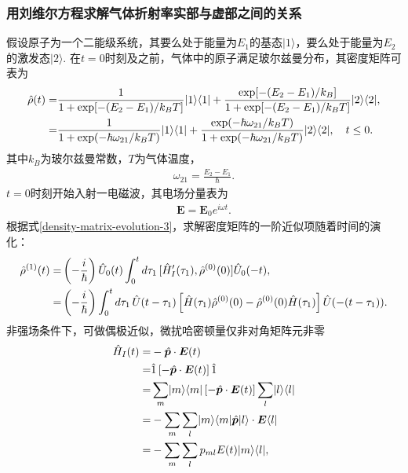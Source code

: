 \documentclass{assignment}
\begin{document}
\subsubsection{用刘维尔方程求解气体折射率实部与虚部之间的关系}
假设原子为一个二能级系统，其要么处于能量为$E_1$的基态$\lvert 1\rangle$，要么处于能量为$E_2$的激发态$\lvert 2\rangle$. 在$t=0$时刻及之前，气体中的原子满足玻尔兹曼分布，其密度矩阵可表为
\begin{align}
    \notag\hat{\rho}(t)=&\frac{1}{1+\exp[-(E_2-E_1)/k_BT]}\lvert 1\rangle\langle 1\rvert+\frac{\exp[-(E_2-E_1)/k_B]}{1+\exp[-(E_2-E_1)/k_BT]}\lvert 2\rangle\langle 2\rvert,\\
    =&\frac{1}{1+\exp(-\hbar\omega_{21}/k_BT)}\lvert 1\rangle\langle 1\rvert+\frac{\exp(-\hbar\omega_{21}/k_BT)}{1+\exp(-\hbar\omega_{21}/k_BT)}\lvert 2\rangle\langle 2\rvert,\quad t\leq 0.
\end{align}
其中$k_B$为玻尔兹曼常数，$T$为气体温度，
\begin{align}
    \omega_{21}=\frac{E_2-E_1}{\hbar}.
\end{align}
$t=0$时刻开始入射一电磁波，其电场分量表为
\begin{align}
    \bm{E}=\bm{E}_0e^{i\omega t}.
\end{align}
根据式\eqref{density-matrix-evolution-3}，求解密度矩阵的一阶近似项随着时间的演化：
\begin{align}
    \label{density-matrix-evolution-4}
    \notag\hat{\rho}^{(1)}(t)=&\left(-\frac{i}{\hbar}\right)\hat{U}_0(t)\int_0^td\tau_1\,[\hat{H}_I'(\tau_1),\hat{\rho}^{(0)}(0)]\hat{U}_0(-t),\\
    =&\left(-\frac{i}{\hbar}\right)\int_0^td\tau_1\,\hat{U}(t-\tau_1)\left[\hat{H}(\tau_1)\hat{\rho}^{(0)}(0)-\hat{\rho}^{(0)}(0)\hat{H}(\tau_1)\right]\hat{U}(-(t-\tau_1)).
\end{align}
非强场条件下，可做偶极近似，微扰哈密顿量仅非对角矩阵元非零
\begin{align}
    \notag\hat{H}_I(t)=&-\hat{\bm{p}}\cdot\bm{E}(t)\\
    \notag=&\hat{1}\left[-\hat{\bm{p}}\cdot\bm{E}(t)\right]\hat{1}\\
    \notag=&\sum_m\lvert m\rangle\langle m\rvert\left[-\hat{\bm{p}}\cdot\bm{E}(t)\right]\sum_l\lvert l\rangle\langle l\rvert\\
    \notag=&-\sum_m\sum_l\lvert m\rangle\langle m\rvert\hat{\bm{p}}\lvert l\rangle\cdot\bm{E}\langle l\rvert\\
    =&-\sum_m\sum_lp_{ml}E(t)\lvert m\rangle\langle l\rvert,
\end{align}
\end{document}
